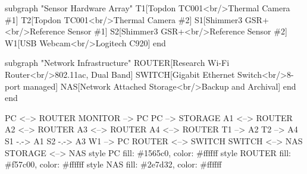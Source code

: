 \documentclass[12pt,a4paper]{report}
\begin{document}
        subgraph "Sensor Hardware Array"
            T1[Topdon TC001<br/>Thermal Camera \#1]
            T2[Topdon TC001<br/>Thermal Camera \#2]
            S1[Shimmer3 GSR+<br/>Reference Sensor \#1]
            S2[Shimmer3 GSR+<br/>Reference Sensor \#2]
            W1[USB Webcam<br/>Logitech C920]
        end

        subgraph "Network Infrastructure"
            ROUTER[Research Wi-Fi Router<br/>802.11ac, Dual Band]
            SWITCH[Gigabit Ethernet Switch<br/>8-port managed]
            NAS[Network Attached Storage<br/>Backup and Archival]
        end
    end

    PC <--> ROUTER
    MONITOR --> PC
    PC --> STORAGE
    A1 <--> ROUTER
    A2 <--> ROUTER
    A3 <--> ROUTER
    A4 <--> ROUTER
    T1 --> A2
    T2 --> A4
    S1 -.-> A1
    S2 -.-> A3
    W1 --> PC
    ROUTER <--> SWITCH
    SWITCH <--> NAS
    STORAGE <--> NAS
    style PC fill: \#1565c0, color: \#ffffff
    style ROUTER fill: \#f57c00, color: \#ffffff
    style NAS fill: \#2e7d32, color: \#ffffff
\end{document}
